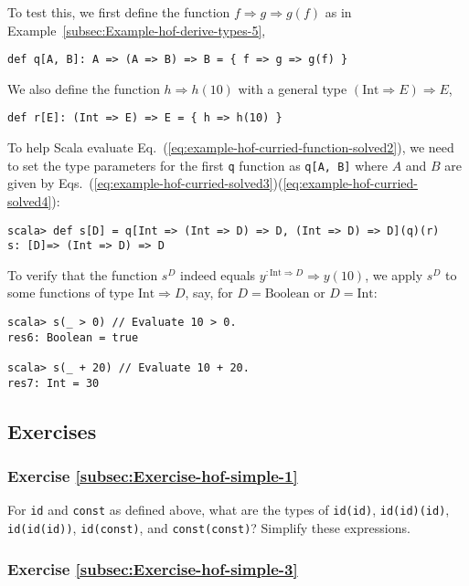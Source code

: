 To test this, we first define the function $f\Rightarrow g\Rightarrow g(f)$
as in Example~\ref{subsec:Example-hof-derive-types-5},
\begin{lstlisting}
def q[A, B]: A => (A => B) => B = { f => g => g(f) }
\end{lstlisting}
We also define the function $h\Rightarrow h(10)$ with a general type
$\left(\text{Int}\Rightarrow E\right)\Rightarrow E$,
\begin{lstlisting}
def r[E]: (Int => E) => E = { h => h(10) }
\end{lstlisting}
To help Scala evaluate Eq.~(\ref{eq:example-hof-curried-function-solved2}),
we need to set the type parameters for the first \lstinline!q! function
as \lstinline!q[A, B]! where $A$ and $B$ are given by Eqs.~(\ref{eq:example-hof-curried-solved3})\textendash (\ref{eq:example-hof-curried-solved4}):
\begin{lstlisting}
scala> def s[D] = q[Int => (Int => D) => D, (Int => D) => D](q)(r)
s: [D]=> (Int => D) => D
\end{lstlisting}
To verify that the function $s^{D}$ indeed equals $y^{:\text{Int}\Rightarrow D}\Rightarrow y(10)$,
we apply $s^{D}$ to some functions of type $\text{Int}\Rightarrow D$,
say, for $D=\text{Boolean}$ or $D=\text{Int}$:
\begin{lstlisting}
scala> s(_ > 0) // Evaluate 10 > 0.
res6: Boolean = true

scala> s(_ + 20) // Evaluate 10 + 20.
res7: Int = 30
\end{lstlisting}


\subsection{Exercises}

\subsubsection{Exercise \label{subsec:Exercise-hof-simple-1}\ref{subsec:Exercise-hof-simple-1}}

For \lstinline!id! and \lstinline!const! as defined above, what
are the types of \lstinline!id(id)!, \lstinline!id(id)(id)!, \lstinline!id(id(id))!,
\lstinline!id(const)!, and \lstinline!const(const)!? Simplify these
expressions.

\subsubsection{Exercise \label{subsec:Exercise-hof-simple-3}\ref{subsec:Exercise-hof-simple-3}}

